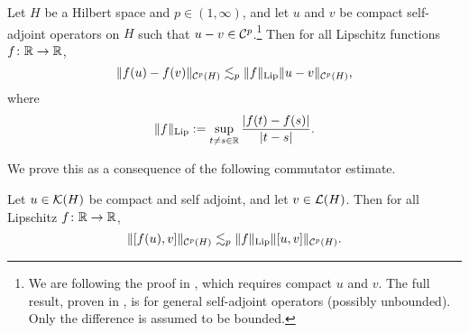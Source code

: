\begin{thm}\label{thm:Potapov-Sukochev}
  Let $H$ be a Hilbert space and $p \in (1,\infty)$, and let $u$ and $v$ be compact self-adjoint operators on $H$ such that $u - v \in \mathcal{C}^{p}$.\footnote{We are following the proof in \cite[.c]{HNVW16}, which requires compact $u$ and $v$. The full result, proven in \cite{PS11}, is for general self-adjoint operators (possibly unbounded). Only the difference is assumed to be bounded.}
  Then for all Lipschitz functions $f \colon \mathbb{R} \rightarrow \mathbb{R}$,
  \begin{equation*}
    \|f(u) - f(v)\|_{\mathcal{C}^{p}(H)} \lesssim_{p} \|f\|_{\mathrm{Lip}} \|u - v\|_{\mathcal{C}^{p}(H)},
  \end{equation*}
  where
  \begin{equation*}
    \|f\|_{\mathrm{Lip}} := \sup_{t \neq s \in \mathbb{R}} \frac{|f(t) - f(s)|}{|t-s|}.
  \end{equation*}
\end{thm}

We prove this as a consequence of the following commutator estimate.

\begin{lem}\label{lem:commutators}
  Let $u \in \mathcal{K}(H)$ be compact and self adjoint, and let $v \in \mathcal{L}(H)$.
  Then for all Lipschitz $f \colon \mathbb{R} \rightarrow \mathbb{R}$,
  \begin{equation*}
    \|[f(u),v]\|_{\mathcal{C}^{p}(H)} \lesssim_{p} \|f\|_{\mathrm{Lip}} \|[u,v]\|_{\mathcal{C}^{p}(H)}.
  \end{equation*}
\end{lem}

